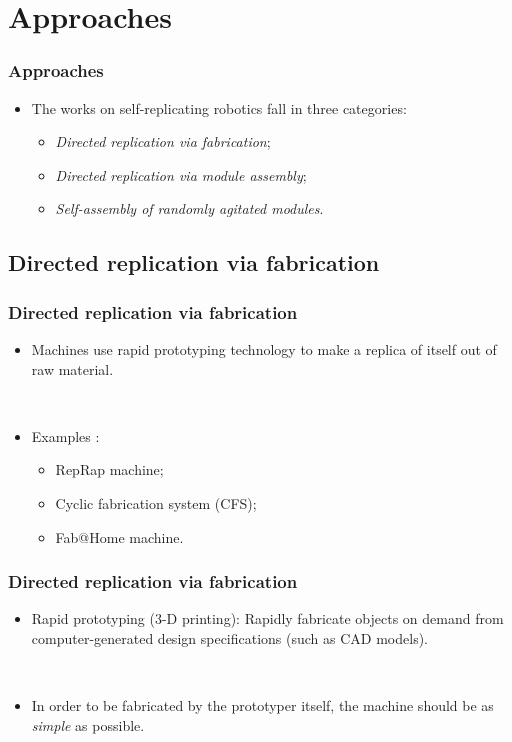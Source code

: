 \documentclass[14pt]{beamer}
\theoremstyle{remark}
\begin{document}
\section{Approaches}

\begin{frame}
  \frametitle{Approaches}
  \begin{itemize}
  	\item The works on self-replicating robotics fall in three categories\cite{lee_robotic_2008}:
  	\begin{itemize}
  	  \item \emph{Directed replication via fabrication};
      \item \emph{Directed replication via module assembly};
      \item \emph{Self-assembly of randomly agitated modules}.
  	\end{itemize}
	\end{itemize}
\end{frame}

\subsection{Directed replication via fabrication}
\begin{frame}
  \frametitle{Directed replication via fabrication}
  \begin{itemize}
  	\item Machines use rapid prototyping technology to make a replica of itself out of raw material.
  	
  	\mbox{ }
  	
  	\item Examples :
  	\begin{itemize}
  	  \item RepRap machine\cite{jones_reprap_2011};
  	  \item Cyclic fabrication system (CFS)\cite{moses_towards_2009};
  	  \item Fab@Home machine\cite{malone_fabhome:_2007}.
  	\end{itemize}
	\end{itemize}
\end{frame}

\begin{frame}
  \frametitle{Directed replication via fabrication}
  \begin{itemize}
  	\item Rapid prototyping (3-D printing): Rapidly fabricate objects on demand from computer-generated design specifications (such as CAD models)\cite{lipson_homemade_2005}.
  	
  	\mbox{ }
  	
  	\item In order to be fabricated by the prototyper itself, the machine should be as \emph{simple} as possible.
	\end{itemize}
\end{frame}
\end{document}

